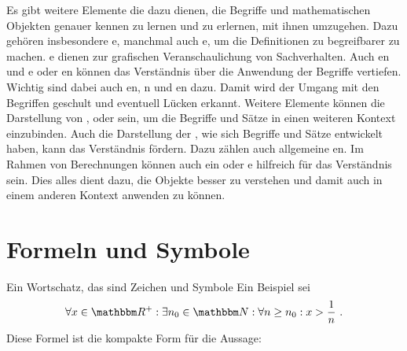 \begin{Unit}
Es gibt weitere Elemente die dazu dienen, die Begriffe und mathematischen 
Objekten genauer kennen zu lernen und zu erlernen, mit ihnen umzugehen. Dazu 
gehören insbesondere e, manchmal auch 
e, um die Definitionen zu begreifbarer zu machen.
e dienen zur grafischen Veranschaulichung von Sachverhalten.
Auch en und e oder 
en können das Verständnis über die Anwendung der Begriffe
vertiefen. Wichtig sind dabei auch en, n und
en dazu. Damit wird der Umgang mit den Begriffen geschult und
eventuell Lücken erkannt. Weitere Elemente können die Darstellung von
,  oder  sein, 
um die Begriffe und Sätze in einen weiteren Kontext einzubinden. Auch die
Darstellung der , wie sich Begriffe und Sätze entwickelt 
haben, kann das Verständnis fördern. Dazu zählen auch allgemeine 
en. Im Rahmen von Berechnungen können auch ein
 oder e hilfreich für das 
Verständnis sein. Dies alles dient dazu, die Objekte besser zu verstehen und 
damit auch in einem anderen Kontext anwenden zu können.
\end{Unit}

\section{Formeln und Symbole}
\label{sec:Gdl-K01-A02}

Ein Wortschatz, das sind Zeichen und Symbole Ein Beispiel sei
\begin{align}
  \forall x \in \RR^+: \exists n_0 \in \NN : \forall n \geq n_0: 
    x > \frac{1}{n} \ .
\end{align}
Diese Formel ist die kompakte Form für die Aussage:

